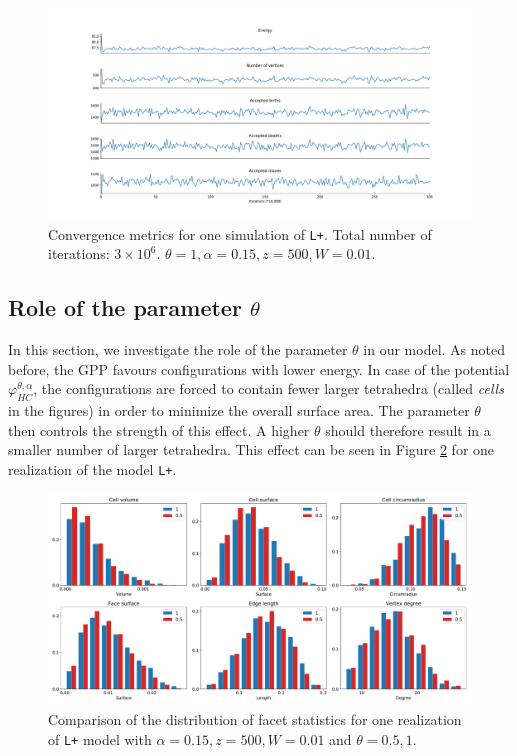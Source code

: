 \begin{figure}
	\hspace{-2.7cm}
  \includegraphics[width=1.25\textwidth]{../img/numeric/convergence.pdf}
  \caption{Convergence metrics for one simulation of \texttt{L+}. Total number of iterations: $3\times 10^6$. $\theta = 1, \alpha = 0.15, z = 500, W = 0.01$.}
  \label{fig:convergence}
\end{figure}


\subsection{Role of the parameter $\theta$}
In this section, we investigate the role of the parameter $\theta$ in our model. As noted before, the GPP favours configurations with lower energy. In case of the potential $\varphi^{\theta,\alpha}_{HC}$, the configurations are forced to contain fewer larger tetrahedra (called \textit{cells} in the figures) in order to minimize the overall surface area. The parameter $\theta$ then controls the strength of this effect. A higher $\theta$ should therefore result in a smaller number of larger tetrahedra. This effect can be seen in Figure \ref{fig:thetaeffect} for one realization of the model \texttt{L+}.

\begin{figure}
  \centering
  \includegraphics[width=1\textwidth]{../img/numeric/facets_1_05.pdf}
  \caption{Comparison of the distribution of facet statistics for one realization of \texttt{L+} model with $\alpha=0.15,z=500,W=0.01$ and $\theta = 0.5,1$.  }
  \label{fig:thetaeffect}
\end{figure}


